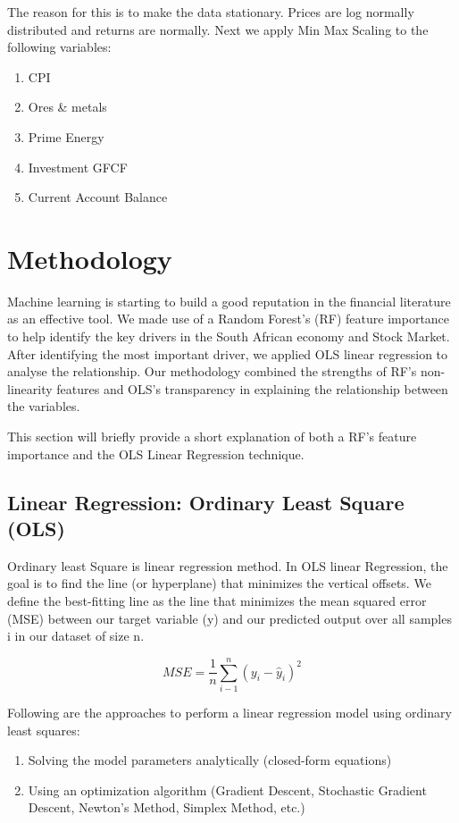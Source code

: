 \documentclass{elsarticle}
\begin{document}
The reason for this is to make the data stationary. Prices are log normally distributed and returns are normally. Next we apply Min Max Scaling to the following variables:
\begin{enumerate}
    \item CPI
    \item Ores & metals
    \item Prime Energy
    \item Investment GFCF
    \item Current Account Balance
\end{enumerate}


\section{Methodology}
Machine learning is starting to build a good reputation in the financial literature as an effective tool. We made use of a Random Forest's (RF) feature importance to help identify the key drivers in the South African economy and Stock Market. After identifying the most important driver, we applied OLS linear regression to analyse the relationship. Our methodology combined the strengths of RF's non-linearity features and OLS's transparency in explaining the relationship between the variables. 

This section will briefly provide a short explanation of both a RF's feature importance and the OLS Linear Regression technique.

\subsection{Linear Regression: Ordinary Least Square (OLS)}
Ordinary least Square is linear regression method. In OLS linear Regression, the goal is to find the line (or hyperplane) that minimizes the vertical offsets. We define the best-fitting line as the line that minimizes the mean squared error (MSE) between our target variable (y) and our predicted output over all samples i in our dataset of size n.

$$MSE = \frac{1}{n} \sum_{i-1}^{n} (y_i - \hat{y}_i)^2$$

Following are the approaches to perform a linear regression model using ordinary least squares:
\begin{enumerate}
    \item Solving the model parameters analytically (closed-form equations)
    \item Using an optimization algorithm (Gradient Descent, Stochastic Gradient Descent, Newton’s Method, Simplex Method, etc.)
\end{enumerate}
\end{document}
